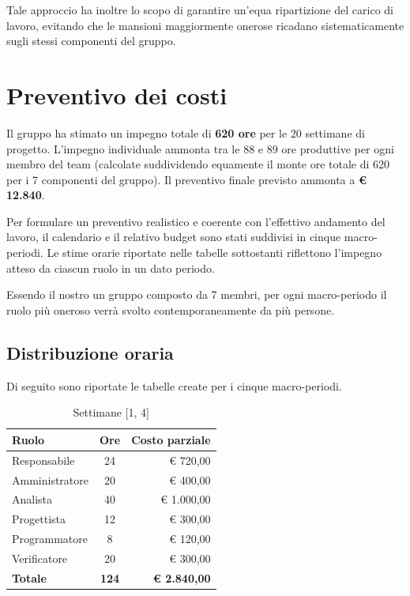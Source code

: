 \documentclass[11pt, a4paper]{article}
\begin{document}
\noindent
Tale approccio ha inoltre lo scopo di garantire un'equa ripartizione del carico di lavoro, evitando che le mansioni maggiormente onerose ricadano sistematicamente sugli stessi componenti del gruppo.

\section{Preventivo dei costi}
Il gruppo ha stimato un impegno totale di \textbf{620 ore} per le 20 settimane di progetto. L'impegno individuale ammonta tra le 88 e 89 ore produttive per ogni membro del team (calcolate suddividendo equamente il monte ore totale di 620 per i 7 componenti del gruppo). Il preventivo finale previsto ammonta a \textbf{€ 12.840}.

\noindent
Per formulare un preventivo realistico e coerente con l'effettivo andamento del lavoro, il calendario e il relativo budget sono stati suddivisi in cinque macro-periodi. Le stime orarie riportate nelle tabelle sottostanti riflettono l'impegno atteso da ciascun ruolo in un dato periodo. 

\noindent
Essendo il nostro un gruppo composto da 7 membri, per ogni macro-periodo il ruolo più oneroso verrà svolto contemporaneamente da più persone. 

\subsection{Distribuzione oraria}
Di seguito sono riportate le tabelle create per i cinque macro-periodi.

\begin{table}[htbp]
    \centering
    \caption{Settimane [1, 4]}
    \vspace{0.2cm}
    \renewcommand{\arraystretch}{1.5}
    \begin{tabularx}{\textwidth}{|X|c|r|}
        \hline
        \rowcolor{gray!10} \textbf{Ruolo} & \textbf{Ore} & \textbf{Costo parziale} \\ \hline
        Responsabile & 24 & € 720,00 \\ \hline
        Amministratore & 20 & € 400,00 \\ \hline
        Analista & 40 & € 1.000,00 \\ \hline
        Progettista & 12 & € 300,00 \\ \hline
        Programmatore & 8 & € 120,00 \\ \hline
        Verificatore & 20 & € 300,00 \\ \hline
        \rowcolor{gray!20} \textbf{Totale} & \textbf{124} & \textbf{€ 2.840,00} \\ \hline
    \end{tabularx}
\end{table}
\end{document}
